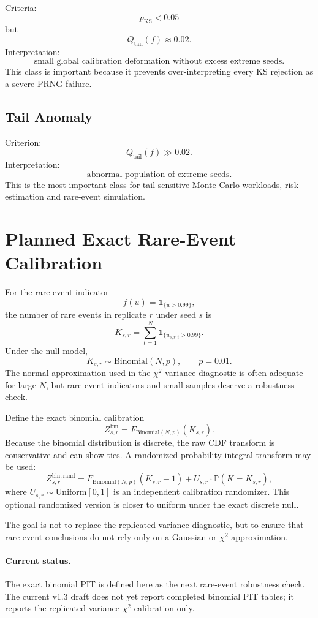 \documentclass[11pt,a4paper]{article}
\newcommand{\Bin}{\mathrm{Binomial}}
\newcommand{\Unif}{\mathrm{Uniform}}
\newcommand{\Qtail}{Q_{\mathrm{tail}}}
\newcommand{\KS}{\mathrm{KS}}
\begin{document}
Criteria:
\[
p_{\KS}<0.05
\]
but
\[
\Qtail(f)\approx0.02.
\]
Interpretation:
\[
\boxed{
\text{small global calibration deformation without excess extreme seeds.}
}
\]
This class is important because it prevents over-interpreting every KS rejection as a severe PRNG failure.

\subsection{Tail Anomaly}

Criterion:
\[
\Qtail(f)\gg0.02.
\]
Interpretation:
\[
\boxed{
\text{abnormal population of extreme seeds.}
}
\]
This is the most important class for tail-sensitive Monte Carlo workloads, risk estimation and rare-event simulation.

\section{Planned Exact Rare-Event Calibration}

For the rare-event indicator
\[
f(u)=\mathbf 1_{\{u>0.99\}},
\]
the number of rare events in replicate $r$ under seed $s$ is
\[
K_{s,r}
=
\sum_{t=1}^{N}
\mathbf 1_{\{u_{s,r,t}>0.99\}}.
\]
Under the null model,
\[
K_{s,r}
\sim
\Bin(N,p),
\qquad
p=0.01.
\]
The normal approximation used in the $\chi^2$ variance diagnostic is often adequate for large $N$, but rare-event indicators and small samples deserve a robustness check.

Define the exact binomial calibration
\[
\boxed{
Z^{\mathrm{bin}}_{s,r}
=
F_{\Bin(N,p)}
\left(
K_{s,r}
\right).
}
\]
Because the binomial distribution is discrete, the raw CDF transform is conservative and can show ties. A randomized probability-integral transform may be used:
\[
Z^{\mathrm{bin,rand}}_{s,r}
=
F_{\Bin(N,p)}(K_{s,r}-1)
+
U_{s,r}
\cdot
\mathbb P(K=K_{s,r}),
\]
where $U_{s,r}\sim\Unif[0,1]$ is an independent calibration randomizer. This optional randomized version is closer to uniform under the exact discrete null.

The goal is not to replace the replicated-variance diagnostic, but to ensure that rare-event conclusions do not rely only on a Gaussian or $\chi^2$ approximation.

\paragraph{Current status.}
The exact binomial PIT is defined here as the next rare-event robustness check. The current v1.3 draft does not yet report completed binomial PIT tables; it reports the replicated-variance $\chi^2$ calibration only.
\end{document}
